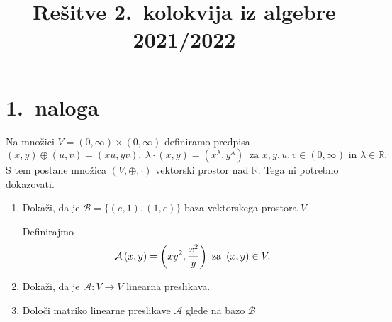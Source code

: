 \documentclass[a4,11pt]{article}
\title{Rešitve 2.~kolokvija iz algebre 2021/2022}
\author{}
\date{}
\newcommand{\R}{\mathbb{R}}
\begin{document}
\maketitle

\section*{1.~naloga}
    Na množici \(V = \left(0, \infty\right) \times \left(0, \infty\right)\) definiramo predpisa
    \[\left(x, y\right) \oplus \left(u, v\right) = \left(xu, yv\right), \ \lambda\cdot \left(x, y\right) = \left(x^\lambda, y^\lambda\right) \ \text{ za } x, y, u, v \in \left(0, \infty\right) \text{ in } \lambda \in \R.\]
    S tem postane množica \(\left(V, \oplus, \cdot\right)\) vektorski prostor nad \(\R\). Tega ni potrebno dokazovati.
    \begin{enumerate}[label=(\alph*)]
        \item Dokaži, da je \(\mathcal{B} = \{\left(e, 1\right), \left(1, e\right)\}\) baza vektorskega prostora \(V\).

        Definirajmo
        \[ \mathcal{A}\left(x, y\right) = \left(xy^2, \frac{x^2}{y} \right) \space \text{ za } \left(x, y\right) \in V.\]
        \item Dokaži, da je \(\mathcal{A}: V \to V\) linearna preslikava.
        \item Določi matriko linearne preslikave \(\mathcal{A}\) glede na bazo \(\mathcal{B}\)
    \end{enumerate}
\end{document}
